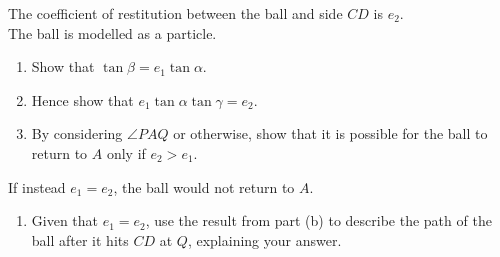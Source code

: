 \documentclass[leqno]{article}
\begin{document}
\begin{enumerate}[
  label=\textbf{\arabic*.},
  leftmargin=*,
  topsep=0pt,
  partopsep=0pt,
  parsep=0pt
]
The coefficient of restitution between the ball and side $CD$ is $e_2$. \\

The ball is modelled as a particle. \\

\begin{enumerate}[label=\textbf{(\alph*)}]
  \item Show that $\tan\beta=e_1\tan\alpha$.  \\
  \item Hence show that $e_1\tan\alpha\tan\gamma=e_2$.  \\
  \item By considering $\angle PAQ$ or otherwise, show that it is possible for the ball to return to $A$ only if $e_2>e_1$.  \\
\end{enumerate}

If instead $e_1=e_2$, the ball would not return to $A$. \\

\begin{enumerate}[label=\textbf{(\alph*)}, resume]
  \item Given that $e_1=e_2$, use the result from part (b) to describe the path of the ball after it hits $CD$ at $Q$, explaining your answer.  \\
\end{enumerate}
\end{enumerate}
\end{document}
